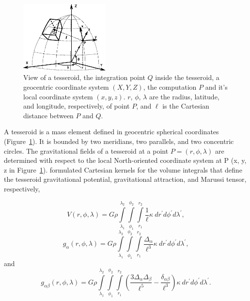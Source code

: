 \documentclass[paper,twocolumn]{geophysics}
\begin{document}
\begin{figure}
    \centering
    \includegraphics[width=0.4\textwidth]{figs/tesseroid}
    \caption{
        View of a tesseroid,
        the integration point $Q$ inside the tesseroid,
        a geocentric coordinate system $(X, Y, Z)$,
        the computation $P$ and it's local coordinate system $(x, y, z)$.
        $r$, $\phi$, $\lambda$ are
        the radius, latitude, and longitude, respectively, of point $P$,
        and $\ell$ is the Cartesian distance between $P$ and $Q$.
    }
    \label{fig:tesseroid}
\end{figure}

A tesseroid is a mass element defined in geocentric spherical
coordinates
(Figure~\ref{fig:tesseroid}).
It is bounded by two meridians, two parallels, and two concentric circles.
The gravitational fields of a tesseroid at a point $P = (r,\phi,\lambda)$
are determined with respect to the local North-oriented coordinate system at
P (x, y, z in Figure~\ref{fig:tesseroid}).
\citet{Grombein2013} formulated Cartesian kernels for the volume integrals
that define the tesseroid gravitational potential, gravitational attraction,
and Marussi tensor, respectively,

\begin{equation}
    V(r,\phi,\lambda) = G \rho
        \int\limits_{\lambda_1}^{\lambda_2}
        \int\limits_{\phi_1}^{\phi_2}
        \int\limits_{r_1}^{r_2}
        \frac{1}{\ell}
        \kappa\  dr^\prime d\phi^\prime d\lambda^\prime,
    \label{eq:tesspot}
\end{equation}
\begin{equation}
    g_{\alpha}(r,\phi,\lambda) = G \rho
        \int\limits_{\lambda_1}^{\lambda_2}
        \int\limits_{\phi_1}^{\phi_2}
        \int\limits_{r_1}^{r_2}
        \frac{\Delta_\alpha}{\ell^3}
        \kappa\ dr^\prime d\phi^\prime d\lambda^\prime,
    \label{eq:tessgrav}
\end{equation}
\noindent
and
\begin{equation}
    g_{\alpha\beta}(r,\phi,\lambda) = G \rho
        \int\limits_{\lambda_1}^{\lambda_2}
        \int\limits_{\phi_1}^{\phi_2}
        \int\limits_{r_1}^{r_2}
        \left(
            \frac{3\Delta_{\alpha} \Delta_{\beta}}{\ell^5} -
            \frac{\delta_{\alpha\beta}}{\ell^3}
        \right)
        \kappa\ dr^\prime d\phi^\prime d\lambda^\prime.
    \label{eq:tesstensor}
\end{equation}
\end{document}
